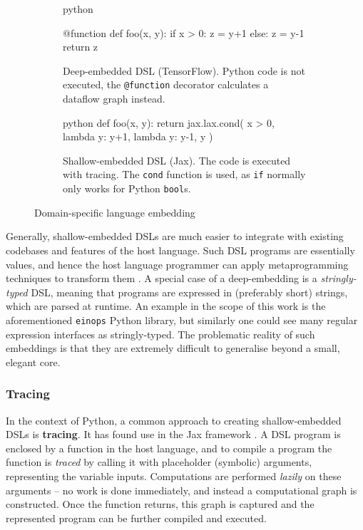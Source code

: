 \begin{figure}[h]
\centering
\begin{subfigure}{.4\textwidth}
  \centering
    \begin{cminted}{python}

@function
def foo(x, y):
  if x > 0: z = y+1
  else:     z = y-1
  return z

    \end{cminted}
      \caption{Deep-embedded DSL (TensorFlow). Python code is not executed, the \texttt{@function} decorator calculates a dataflow graph instead.}
\end{subfigure} \quad %
\begin{subfigure}{.4\textwidth}
  \centering
  \begin{cminted}{python}
def foo(x, y):
  return jax.lax.cond(
    x > 0, 
    lambda y: y+1, 
    lambda y: y-1, 
    y
  )
  \end{cminted}
  \caption{Shallow-embedded DSL (Jax). The code is executed with tracing. The \texttt{cond} function is used, as \texttt{if} normally only works for Python \texttt{bool}s.}
\end{subfigure}
\caption{Domain-specific language embedding}
\label{fig:embeddings}
\end{figure}

Generally, shallow-embedded DSLs are much easier to integrate with existing codebases and features of the host language.
Such DSL programs are essentially values, and hence the host language programmer can apply metaprogramming techniques to transform them \cite{atkey2009unembedding}. 
A special case of a deep-embedding is a \textit{stringly-typed} DSL, meaning that programs are expressed in (preferably short) strings, which are parsed at runtime. An example in the scope of this work is the aforementioned \texttt{einops} Python library, but similarly one could see many regular expression interfaces as stringly-typed. The problematic reality of such embeddings is that they are extremely difficult to generalise beyond a small, elegant core.

\subsubsection{Tracing} \label{tracing}

In the context of Python, a common approach to creating shallow-embedded DSLs is \textbf{tracing}. It has found use in the Jax framework \cite{frostig2018compiling}. A DSL program is enclosed by a function in the host language, and to compile a program the function is \textit{traced} by calling it with placeholder (symbolic) arguments, representing the variable inputs. Computations are performed \textit{lazily} on these arguments -- no work is done immediately, and instead a computational graph is constructed. Once the function returns, this graph is captured and the represented program can be further compiled and executed.

